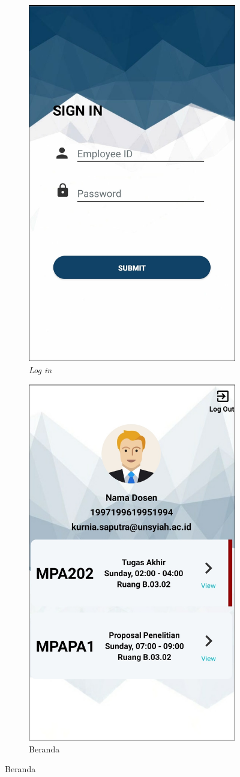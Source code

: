 \begin{enumerate}[a.]
\begin{figure} [H]
\begin{subfigure}{.5\textwidth}
		\includegraphics[width=.5\linewidth]{gambar/android/dosen-2}  
  		\caption{\textit{Log in}}
	\end{subfigure}
		\vspace{1cm}
		\newline
	\begin{subfigure}{.5\textwidth}
  		\centering
	  	\includegraphics[width=.5\linewidth]{gambar/android/dosen-3}  
  		\caption{Beranda}
	\end{subfigure}

\end{figure}
\end{enumerate}
